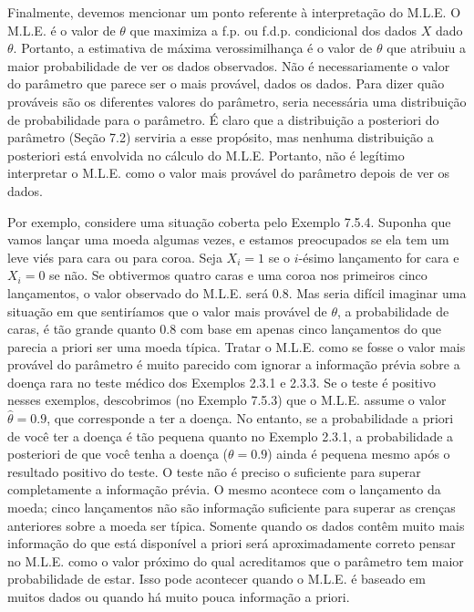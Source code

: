 \vspace{\baselineskip}

Finalmente, devemos mencionar um ponto referente à interpretação do M.L.E. O M.L.E. é o valor de $\theta$ que maximiza a f.p. ou f.d.p. condicional dos dados $X$ dado $\theta$. Portanto, a estimativa de máxima verossimilhança é o valor de $\theta$ que atribuiu a maior probabilidade de ver os dados observados. Não é necessariamente o valor do parâmetro que parece ser o mais provável, dados os dados. Para dizer quão prováveis são os diferentes valores do parâmetro, seria necessária uma distribuição de probabilidade para o parâmetro. É claro que a distribuição a posteriori do parâmetro (Seção 7.2) serviria a esse propósito, mas nenhuma distribuição a posteriori está envolvida no cálculo do M.L.E. Portanto, não é legítimo interpretar o M.L.E. como o valor mais provável do parâmetro depois de ver os dados.

Por exemplo, considere uma situação coberta pelo Exemplo 7.5.4. Suponha que vamos lançar uma moeda algumas vezes, e estamos preocupados se ela tem um leve viés para cara ou para coroa. Seja $X_i=1$ se o $i$-ésimo lançamento for cara e $X_i=0$ se não. Se obtivermos quatro caras e uma coroa nos primeiros cinco lançamentos, o valor observado do M.L.E. será 0.8. Mas seria difícil imaginar uma situação em que sentiríamos que o valor mais provável de $\theta$, a probabilidade de caras, é tão grande quanto 0.8 com base em apenas cinco lançamentos do que parecia a priori ser uma moeda típica. Tratar o M.L.E. como se fosse o valor mais provável do parâmetro é muito parecido com ignorar a informação prévia sobre a doença rara no teste médico dos Exemplos 2.3.1 e 2.3.3. Se o teste é positivo nesses exemplos, descobrimos (no Exemplo 7.5.3) que o M.L.E. assume o valor $\hat{\theta}=0.9$, que corresponde a ter a doença. No entanto, se a probabilidade a priori de você ter a doença é tão pequena quanto no Exemplo 2.3.1, a probabilidade a posteriori de que você tenha a doença ($\theta=0.9$) ainda é pequena mesmo após o resultado positivo do teste. O teste não é preciso o suficiente para superar completamente a informação prévia. O mesmo acontece com o lançamento da moeda; cinco lançamentos não são informação suficiente para superar as crenças anteriores sobre a moeda ser típica. Somente quando os dados contêm muito mais informação do que está disponível a priori será aproximadamente correto pensar no M.L.E. como o valor próximo do qual acreditamos que o parâmetro tem maior probabilidade de estar. Isso pode acontecer quando o M.L.E. é baseado em muitos dados ou quando há muito pouca informação a priori.

